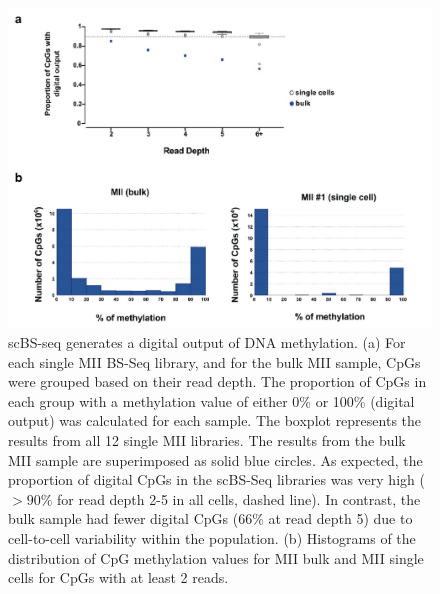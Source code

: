 
\ifpdf
    \graphicspath{{Chapter3/bs/Figs/Raster/}{Chapter3/bs/Figs/PDF/}{Chapter3/bs/Figs/}}
\else
    \graphicspath{{Chapter3/bs/Figs/Vector/}{Chapter3/bs/Figs/}}
\fi

\begin{figure}[htbp!]
\centering
\includegraphics[width=1.0\textwidth]{binary}
\caption[scBS-seq generates a digital output of DNA methylation.]{scBS-seq generates a digital output of DNA methylation. (a) For each single MII BS-Seq library, and for the bulk MII sample, CpGs were grouped based on their read depth. The proportion of CpGs in each group with a methylation value of either 0\% or 100\% (digital output) was calculated for each sample. The boxplot represents the results from all 12 single MII libraries. The results from the bulk MII sample are superimposed as solid blue circles. As expected, the proportion of digital CpGs in the scBS-Seq libraries was very high ($>90\%$ for read depth 2-5 in all cells, dashed line). In contrast, the bulk sample had fewer digital CpGs (66\% at read depth 5) due to cell-to-cell variability within the population. (b) Histograms of the distribution of CpG methylation values for MII bulk and MII single cells for CpGs with at least 2 reads.}
\label{fig:bs_binary}
\end{figure}
